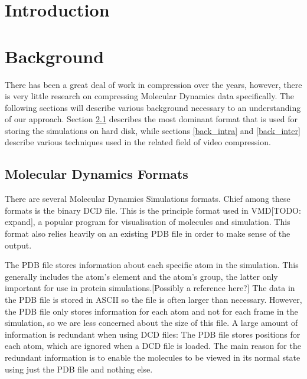 \documentclass[a4paper,11pt]{report}
\begin{document}
\begin{titlepage}
 
\end{titlepage}

\begin{abstract}
 
\end{abstract}

\chapter{Introduction}

\chapter{Background}

There has been a great deal of work in compression over the years, however, there is very little research on compressing Molecular Dynamics data specifically.
The following sections will describe various background necessary to an understanding of our approach.
Section \ref{back_mdf} describes the most dominant format that is used for storing the simulations on hard disk,
while sections \ref{back_intra} and \ref{back_inter} describe various techniques used in the related field of video compression.

\section{Molecular Dynamics Formats}
\label{back_mdf}

There are several Molecular Dynamics Simulations formats. Chief among these formats is the binary DCD file. This is the principle format used in VMD\cite{vmd}[TODO: expand], a popular program for visualisation of molecules and simulation. This format also relies heavily on an existing PDB file in order to make sense of the output.

The PDB file stores information about each specific atom in the simulation. This generally includes the atom's element and the atom's group, the latter only important for use in protein simulations.[Possibly a reference here?] The data in the PDB file is stored in ASCII so the file is often larger than necessary. However, the PDB file only stores information for each atom and not for each frame in the simulation, so we are less concerned about the size of this file. A large amount of information is redundant when using DCD files: The PDB file stores positions for each atom, which are ignored when a DCD file is loaded. The main reason for the redundant information is to enable the molecules to be viewed in its normal state using just the PDB file and nothing else.
\end{document}
